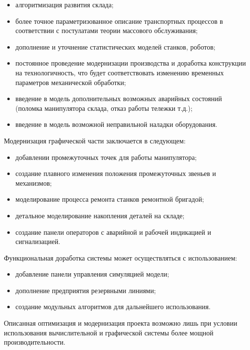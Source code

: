 \begin{itemize}
    \item алгоритмизация развития склада;
    \item более точное параметризованное описание транспортных процессов в соответствии с постулатами теории массового обслуживания;
    \item дополнение и уточнение статистических моделей станков, роботов;
    \item постоянное проведение модернизации производства и доработка конструкции на технологичность, что будет соответствовать изменению временных параметров механической обработки;
    \item введение в модель дополнительных возможных аварийных состояний (поломка манипулятора склада, отказ работы тележки т.д.);
    \item введение в модель возможной неправильной наладки оборудования.
\end{itemize}

Модернизация графической части заключается в следующем:

\begin{itemize}
    \item добавлении промежуточных точек для работы манипулятора;
    \item создание плавного изменения положения промежуточных звеньев и механизмов;
    \item моделирование процесса ремонта станков ремонтной бригадой;
    \item детальное моделирование накопления деталей на складе;
    \item создание панели операторов с аварийной и рабочей индикацией и сигнализацией.
\end{itemize}

Функциональная доработка системы может осуществляться с использованием:

\begin{itemize}
    \item добавление панели управления симуляцией модели;
    \item дополнение предприятия резервными линиями;
    \item создание модульных алгоритмов для дальнейшего использования.
\end{itemize}

Описанная оптимизация и модернизация проекта возможно лишь при условии использования вычислительной и графической системы более мощной производительности.

